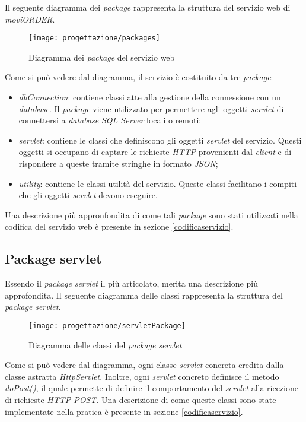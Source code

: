 Il seguente diagramma dei \textit{package} rappresenta la struttura del servizio web di \textit{moviORDER}.

\begin{figure}[!h] 
    \centering 
    \texttt{[image: progettazione/packages]} 
    \caption{Diagramma dei \textit{package} del servizio web}
\end{figure}

Come si può vedere dal diagramma, il servizio è costituito da tre \textit{package}:
\begin{itemize}
	\item \textit{dbConnection}: contiene classi atte alla gestione della connessione con un \textit{database}. Il \textit{package} viene utilizzato per permettere agli oggetti \textit{servlet} di connettersi a \textit{database} \textit{SQL Server} locali o remoti;
	\item \textit{servlet}: contiene le classi che definiscono gli oggetti \textit{servlet} del servizio. Questi oggetti si occupano di captare le richieste \textit{HTTP} provenienti dal \textit{client} e di rispondere a queste tramite stringhe in formato \textit{JSON};
	\item \textit{utility}: contiene le classi utilità del servizio. Queste classi facilitano i compiti che gli oggetti \textit{servlet} devono eseguire.
\end{itemize}
Una descrizione più appronfondita di come tali \textit{package} sono stati utilizzati nella codifica del servizio web è presente in sezione \ref{codificaservizio}.

\subsection{Package servlet}

Essendo il \textit{package} \textit{servlet} il più articolato, merita una descrizione più approfondita. Il seguente diagramma delle classi rappresenta la struttura del \textit{package} \textit{servlet}.

\begin{figure}[!h] 
    \centering 
    \texttt{[image: progettazione/servletPackage]} 
    \caption{Diagramma delle classi del \textit{package} \textit{servlet}}
\end{figure}

Come si può vedere dal diagramma, ogni classe \textit{servlet} concreta eredita dalla classe astratta \textit{HttpServlet}. Inoltre, ogni \textit{servlet} concreto definisce il metodo \textit{doPost()}, il quale permette di definire il comportamento del \textit{servlet} alla ricezione di richieste \textit{HTTP POST}. Una descrizione di come queste classi sono state implementate nella pratica è presente in sezione \ref{codificaservizio}.

